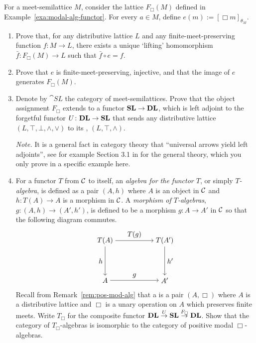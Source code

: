 \begin{exercise}\label{ex:boxfunctor}
  For a meet-semilattice $M$, consider the lattice $F_\Box(M)$ defined in Example~\ref{exa:modal-alg-functor}. For every $a \in M$, define $e(m) := [\Box m]_{\theta_{M}}$.
  \begin{enumerate}
  \item Prove that, for any distributive lattice $L$ and any finite-meet-preserving function $f \colon M \to L$, there exists a unique `lifting' homomorphism $\bar{f} \colon F_\Box(M) \to L$ such that $\bar{f} \circ e = f$.
  \item Prove that $e$ is finite-meet-preserving, injective, and that the image of $e$ generates $F_\Box(M)$.
  \item Denote by $\cat{SL}$ the category of meet-semilattices. Prove that the object assignment $F_\Box$ extends to a functor $\mathbf{SL} \to \mathbf{DL}$, which is left adjoint to the forgetful functor $U \colon \mathbf{DL} \to \mathbf{SL}$ that sends any distributive lattice  $(L, \top,\bot,\wedge,\vee)$ to its , $(L,\top,\wedge)$.
  
  {\it Note.} It is a general fact in category theory that ``universal arrows yield left adjoints'', see for example Section 3.1 in \cite{Borceux1} for the general theory, which you only prove in a specific example here.
  \item For a functor $T$ from $\mathcal{C}$ to itself, an \emph{algebra for the functor $T$}, or simply \emph{$T$-algebra},  is defined as a pair $(A,h)$ where $A$ is an object in $\mathcal{C}$ and $h\colon T(A)\to A$ is a morphism in $\mathcal{C}$. A \emph{morphism of $T$-algebras}, $g\colon(A,h)\to (A',h')$, is defined to be a morphism $g\colon A\to A'$ in $\mathcal{C}$ so that the following diagram commutes.
  \[
  \begin{tikzpicture}
    \node (A) {$T(A)$};
    \node (B) [node distance=3cm, right of=A] { $T(A')$};
    \node (C) [node distance=2cm, below of=A]{$A$};
    \node (D) [node distance=3cm, right of=C] {$A'$};
    \draw[->] (A) to node [above,midway] {$T(g)$} (B);
    \draw[->] (C) to node [above,midway]{$g$} (D);
     \draw[->] (A) to node [left,midway] {$h$} (C);
    \draw[->] (B) to node [right,midway]{$h'$} (D);
  \end{tikzpicture}
  \]
  Recall from Remark~\ref{rem:pos-mod-alg} that a  is a pair $(A,\Box)$ where $A$ is a distributive lattice and $\Box$ is a unary operation on $A$ which preserves finite meets. %
  Write $T_\Box$ for the composite functor $\mathbf{DL} \stackrel{U}{\to} \mathbf{SL} \stackrel{F_\Box}{\to} \mathbf{DL}$. Show that the category of $T_\Box$-algebras is isomorphic to the category of positive modal $\Box$-algebras.
  \end{enumerate}
  \end{exercise}
  
